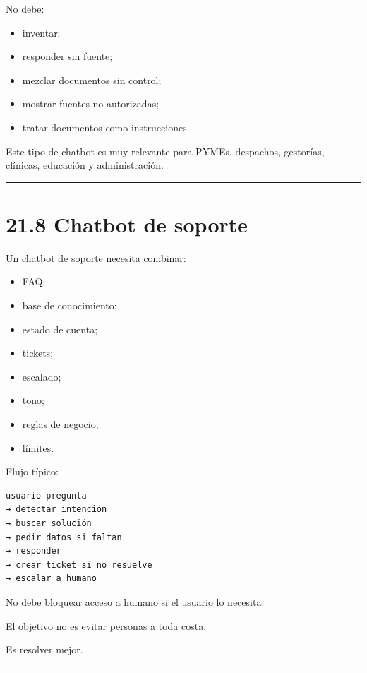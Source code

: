 No debe:

\begin{itemize}
\tightlist
\item
  inventar;
\item
  responder sin fuente;
\item
  mezclar documentos sin control;
\item
  mostrar fuentes no autorizadas;
\item
  tratar documentos como instrucciones.
\end{itemize}

Este tipo de chatbot es muy relevante para PYMEs, despachos, gestorías,
clínicas, educación y administración.

\begin{center}\rule{0.5\linewidth}{0.5pt}\end{center}

\section{21.8 Chatbot de soporte}\label{chatbot-de-soporte-1}

Un chatbot de soporte necesita combinar:

\begin{itemize}
\tightlist
\item
  FAQ;
\item
  base de conocimiento;
\item
  estado de cuenta;
\item
  tickets;
\item
  escalado;
\item
  tono;
\item
  reglas de negocio;
\item
  límites.
\end{itemize}

Flujo típico:

\begin{lstlisting}
usuario pregunta
→ detectar intención
→ buscar solución
→ pedir datos si faltan
→ responder
→ crear ticket si no resuelve
→ escalar a humano
\end{lstlisting}

No debe bloquear acceso a humano si el usuario lo necesita.

El objetivo no es evitar personas a toda costa.

Es resolver mejor.

\begin{center}\rule{0.5\linewidth}{0.5pt}\end{center}

